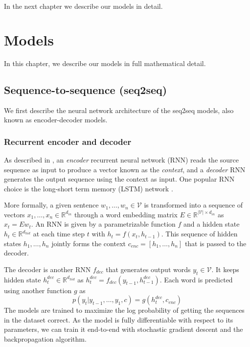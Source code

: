 \documentclass[11pt]{report}
\begin{document}
In the next chapter we describe our models in detail.



\chapter{Models}

In this chapter, we describe our models in full mathematical detail.

\section{Sequence-to-sequence (seq2seq)}

We first describe the neural network architecture of the seq2seq models, also known as encoder-decoder models.

\subsection{Recurrent encoder and decoder}

As described in \cite{bahdanau2014neural}, an \emph{encoder} recurrent neural network (RNN) reads the source sequence as input to produce a vector known as the \emph{context}, and a \emph{decoder} RNN generates the output sequence using the context as input.  One popular RNN choice is the long-short term memory (LSTM) network \citep{hochreiter1997long}.

More formally, a given sentence $w_1, \ldots, w_n \in \mathcal{V}$ is transformed into a sequence of vectors $x_1, \ldots, x_n \in \mathbb{R}^{d_{in}}$ through a word embedding matrix $E \in \mathbb{R}^{|\mathcal{V}| \times d_{in}}$ as $x_t = Ew_t$. An RNN is given by a parametrizable function $f$ and a hidden state $h_t \in \mathbb{R}^{ d_{hid}}$ at each time step $t$ with $h_t = f(x_t, h_{t-1})$. This sequence of hidden states $h_1, \ldots, h_n$ jointly forms the context $c_{enc} = [h_1, \ldots, h_n]$ that is passed to the decoder.


The decoder is another RNN $f_{dec}$ that generates output words $y_t \in \mathcal{V}$. It keeps hidden state $h_t^{dec} \in \mathbb{R}^{d_{hid}}$ as $h_t^{dec} = f_{dec}(y_{t-1}, h_{t-1}^{dec})$. Each word is predicted using another function $g$ as
$$p(y_t | y_{t-1}, \ldots, y_1, c) = g(h_t^{dec}, c_{enc})$$
The models are trained to maximize the log probability of getting the sequences in the dataset correct. As the model is fully differentiable with respect to its parameters, we can train it end-to-end with stochastic gradient descent and the backpropagation algorithm.
\end{document}
